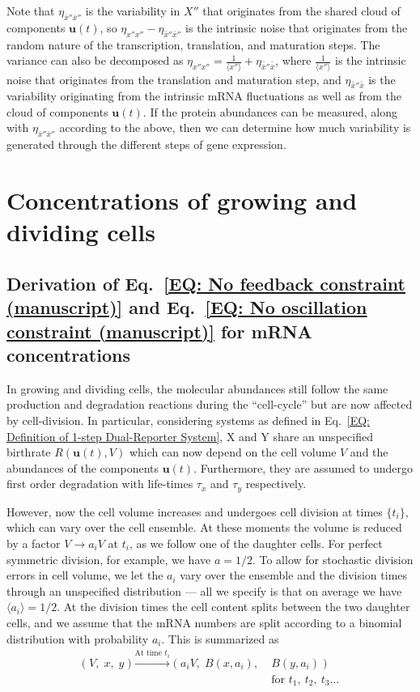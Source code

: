 \documentclass[%
 reprint,prx,
superscriptaddress,
%
%
%
%
%
%
%
%
%
 amsmath,amssymb,
 aps,
%
%
%
%
%
%
]{revtex4-2}
\newlength{\arrow}
\begin{document}
{{Note that $\eta_{\bar{x}''\bar{x}''}$ is the variability in $X''$ that originates from the shared cloud of components $\mathbf{u}(t)$, so $\eta_{x''x''} - \eta_{\bar{x}''\bar{x}''}$ is the intrinsic noise that originates from the random nature of the transcription, translation, and maturation steps. The variance can also be decomposed as $\eta_{x''x''} = \frac{1}{\langle x'' \rangle } + \eta_{\bar{\bar{x}}''\bar{\bar{x}}}$, where $\frac{1}{\langle x'' \rangle } $ is the intrinsic noise that originates from the translation and maturation step, and $\eta_{\bar{\bar{x}}''\bar{\bar{x}}}$ is the variability originating from the intrinsic mRNA fluctuations as well as from the cloud of components $\mathbf{u}(t)$. If the protein abundances can be measured, along with $\eta_{\bar{x}''\bar{x}''}$ according to the above, then we can determine how much variability is generated through the different steps of gene expression. 





\section{Concentrations of growing and dividing cells}
\label{SEC: Appendix concentrations}

\subsection{Derivation of Eq.~\eqref{EQ: No feedback constraint (manuscript)} and Eq.~\eqref{EQ: No oscillation constraint (manuscript)} for mRNA concentrations} 
In growing and dividing cells, the molecular abundances still follow the same production and degradation reactions during the ``cell-cycle'' 
%
%
but are now affected by cell-division. 
In particular, considering systems as defined in Eq.~\eqref{EQ: Definition of 1-step Dual-Reporter System}, X and Y share an unspecified birthrate $R(\mathbf{u}(t),V)$ which can now depend on the cell volume $V$ and the abundances of the components $\mathbf{u}(t)$. Furthermore, they are assumed to undergo first order degradation with life-times $\tau_{x}$ and $\tau_{y}$ respectively. 
%
%
%

However, now the cell volume increases and undergoes cell division at times $\{t_{i}\}$, which can vary over the cell ensemble.
At these moments the volume is reduced by a factor $V \to a_{i}V$ at $t_{i}$, as we follow one of the daughter cells.
For perfect symmetric division, for example, we have $a = 1/2$. To allow for stochastic division errors in cell volume, we let the $a_{i}$ vary over the ensemble and the division times through an unspecified distribution --- 
all we specify is that on average we have $\langle a_{i} \rangle = 1/2$. At the division times the cell content splits between the two daughter cells, and we assume that the mRNA numbers are split according to a binomial distribution with probability $a_{i}$. This is summarized as
\begin{align*}
\big(\;V,\; x, \;y \;\big) \xrightarrow{\text{At time } t_{i}} \big(\;a_{i}V,\; B(x,a_{i}),\; &B(y,a_{i}) \;\big) \\
&\text{for } t_{1},\: t_{2}, \: t_{3} \dots 
\end{align*}


}}
\end{document}
